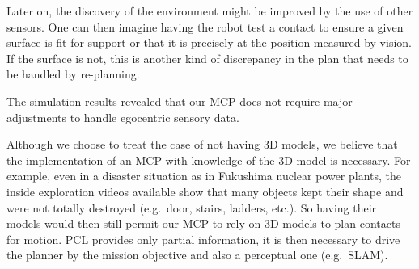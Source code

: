 Later on, the discovery of the environment might be improved by the use of other sensors.
One can then imagine having the robot test a contact to ensure a given surface is fit for support or that it is precisely at the position measured by vision.
If the surface is not, this is another kind of discrepancy in the plan that needs to be handled by re-planning.


The simulation results revealed that our MCP does not require major adjustments to handle egocentric sensory data.

Although we choose to treat the case of not having 3D models, we believe that the implementation of an MCP with knowledge of the 3D model is necessary.
For example, even in a disaster situation as in Fukushima nuclear power plants, the inside exploration videos available show that many objects kept their shape and were not totally destroyed (e.g.\ door, stairs, ladders, etc.).
So having their models would then still permit our MCP to rely on 3D models to plan contacts for motion.
PCL provides only partial information, it is then necessary to drive the planner by the mission objective and also a perceptual one (e.g.\ SLAM).


